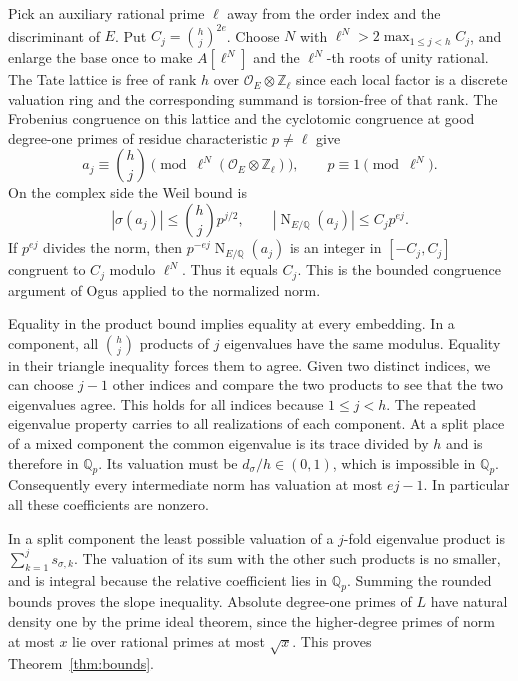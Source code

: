 \documentclass[11pt]{article}
\theoremstyle{definition}
\DeclareMathOperator{\Nm}{N}
\newcommand{\Q}{\mathbb Q}
\newcommand{\Z}{\mathbb Z}
\begin{document}
Pick an auxiliary rational prime \(\ell\) away from the order index
and the discriminant of \(E\). Put \(C_j=\binom hj^{2e}\). Choose \(N\)
with \(\ell^N>2\max_{1\le j<h}C_j\), and enlarge the base once to
make \(A[\ell^N]\) and the \(\ell^N\)-th roots of unity rational.
The Tate lattice is free of rank \(h\) over
\(\mathcal O_E\otimes\Z_\ell\) since each local factor is a discrete
valuation ring and the corresponding summand is torsion-free of that
rank. The Frobenius congruence on this lattice and the cyclotomic
congruence at good degree-one primes of residue characteristic
\(p\ne\ell\) give
\[
 a_j\equiv\binom hj\pmod{\ell^N(\mathcal O_E\otimes\Z_\ell)},
 \qquad p\equiv1\pmod{\ell^N}.
\]
On the complex side the Weil bound is
\[
 |\sigma(a_j)|\le\binom hj p^{j/2},
 \qquad |\Nm_{E/\Q}(a_j)|\le C_jp^{ej}.
\]
If \(p^{ej}\) divides the norm, then
\(p^{-ej}\Nm_{E/\Q}(a_j)\) is an integer in \([-C_j,C_j]\) congruent
to \(C_j\) modulo \(\ell^N\). Thus it equals \(C_j\). This is the
bounded congruence argument of Ogus \cite[Proposition~2.7.2]{ogus}
applied to the normalized norm.

Equality in the product bound implies equality at every embedding.
In a component, all \(\binom hj\) products of \(j\) eigenvalues have
the same modulus. Equality in their triangle inequality forces them
to agree. Given two distinct indices, we can choose \(j-1\) other
indices and compare the two products to see that the two eigenvalues
agree. This holds for all indices because \(1\le j<h\). The repeated
eigenvalue property carries to all realizations of each component.
At a split place of a mixed component the common eigenvalue is its
trace divided by \(h\) and is therefore in \(\Q_p\). Its valuation
must be \(d_\sigma/h\in(0,1)\), which is impossible in \(\Q_p\).
Consequently every intermediate norm has valuation at most \(ej-1\).
In particular all these coefficients are nonzero.

In a split component the least possible valuation of a \(j\)-fold
eigenvalue product is \(\sum_{k=1}^j s_{\sigma,k}\).
The valuation of its sum with the other such products is no smaller,
and is integral because the relative coefficient lies in \(\Q_p\).
Summing the rounded bounds proves the slope inequality. Absolute
degree-one primes of \(L\) have natural density one by the prime ideal
theorem, since the higher-degree primes of norm at most \(x\) lie
over rational primes at most \(\sqrt x\). This proves
Theorem~\ref{thm:bounds}.




\end{document}
